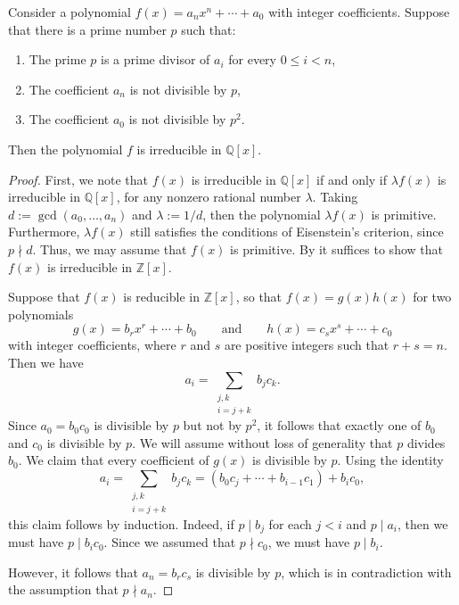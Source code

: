 \begin{theorem}
  Consider a polynomial $f(x)=a_nx^n+\cdots+a_0$ with integer coefficients. Suppose that there is a prime number $p$ such that:
  \begin{enumerate}
  \item The prime $p$ is a prime divisor of $a_i$ for every $0\leq i<n$,
  \item The coefficient $a_n$ is not divisible by $p$,
  \item The coefficient $a_0$ is not divisible by $p^2$.
  \end{enumerate}
  Then the polynomial $f$ is irreducible in $\mathbb{Q}[x]$.
\end{theorem}

\begin{proof}
  First, we note that $f(x)$ is irreducible in $\mathbb{Q}[x]$ if and only if $\lambda f(x)$ is irreducible in $\mathbb{Q}[x]$, for any nonzero rational number $\lambda$. Taking $d:=\gcd(a_0,\ldots,a_n)$ and $\lambda:=1/d$, then the polynomial $\lambda f(x)$ is primitive. Furthermore, $\lambda f(x)$ still satisfies the conditions of Eisenstein's criterion, since $p\nmid d$. Thus, we may assume that $f(x)$ is primitive. By  it suffices to show that $f(x)$ is irreducible in $\mathbb{Z}[x]$.
  
  Suppose that $f(x)$ is reducible in $\mathbb{Z}[x]$, so that $f(x)=g(x)h(x)$ for two polynomials
  \begin{equation*}
    g(x)=b_rx^r+\cdots +b_0\qquad\text{and}\qquad h(x)=c_sx^s+\cdots + c_0
  \end{equation*}
  with integer coefficients, where $r$ and $s$ are positive integers such that $r+s=n$. Then we have
  \begin{equation*}
    a_i = \sum_{\substack{j,k\\i=j+k}}b_jc_k.
  \end{equation*}
  Since $a_0=b_0c_0$ is divisible by $p$ but not by $p^2$, it follows that exactly one of $b_0$ and $c_0$ is divisible by $p$. We will assume without loss of generality that $p$ divides $b_0$. We claim that every coefficient of $g(x)$ is divisible by $p$. Using the identity
  \begin{equation*}
    a_i=\sum_{\substack{j,k\\i=j+k}}b_jc_k = (b_0c_j+\cdots +b_{i-1}c_1)+ b_ic_0,
  \end{equation*}
  this claim follows by induction. Indeed, if $p\mid b_j$ for each $j<i$ and $p\mid a_i$, then we must have $p\mid b_ic_0$. Since we assumed that $p\nmid c_0$, we must have $p\mid b_i$.

  However, it follows that $a_n=b_rc_s$ is divisible by $p$, which is in contradiction with the assumption that $p\nmid a_n$.
\end{proof}

